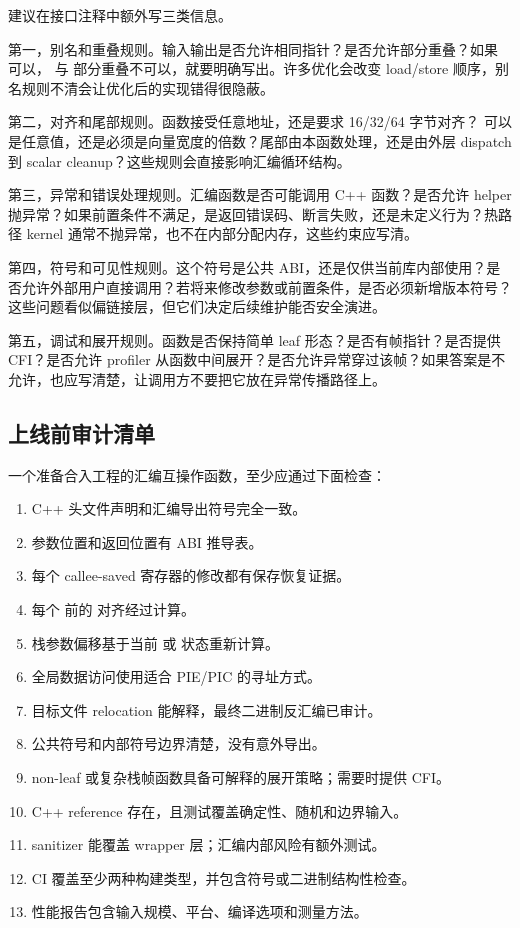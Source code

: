 建议在接口注释中额外写三类信息。

第一，别名和重叠规则。输入输出是否允许相同指针？是否允许部分重叠？如果  可以， 与  部分重叠不可以，就要明确写出。许多优化会改变 load/store 顺序，别名规则不清会让优化后的实现错得很隐蔽。

第二，对齐和尾部规则。函数接受任意地址，还是要求 16/32/64 字节对齐？ 可以是任意值，还是必须是向量宽度的倍数？尾部由本函数处理，还是由外层 dispatch 到 scalar cleanup？这些规则会直接影响汇编循环结构。

第三，异常和错误处理规则。汇编函数是否可能调用 C++ 函数？是否允许 helper 抛异常？如果前置条件不满足，是返回错误码、断言失败，还是未定义行为？热路径 kernel 通常不抛异常，也不在内部分配内存，这些约束应写清。

第四，符号和可见性规则。这个符号是公共 ABI，还是仅供当前库内部使用？是否允许外部用户直接调用？若将来修改参数或前置条件，是否必须新增版本符号？这些问题看似偏链接层，但它们决定后续维护能否安全演进。

第五，调试和展开规则。函数是否保持简单 leaf 形态？是否有帧指针？是否提供 CFI？是否允许 profiler 从函数中间展开？是否允许异常穿过该帧？如果答案是不允许，也应写清楚，让调用方不要把它放在异常传播路径上。

\subsection{上线前审计清单}

一个准备合入工程的汇编互操作函数，至少应通过下面检查：

\begin{enumerate}
  \item C++ 头文件声明和汇编导出符号完全一致。
  \item 参数位置和返回位置有 ABI 推导表。
  \item 每个 callee-saved 寄存器的修改都有保存恢复证据。
  \item 每个  前的  对齐经过计算。
  \item 栈参数偏移基于当前  或  状态重新计算。
  \item 全局数据访问使用适合 PIE/PIC 的寻址方式。
  \item 目标文件 relocation 能解释，最终二进制反汇编已审计。
  \item 公共符号和内部符号边界清楚，没有意外导出。
  \item non-leaf 或复杂栈帧函数具备可解释的展开策略；需要时提供 CFI。
  \item C++ reference 存在，且测试覆盖确定性、随机和边界输入。
  \item sanitizer 能覆盖 wrapper 层；汇编内部风险有额外测试。
  \item CI 覆盖至少两种构建类型，并包含符号或二进制结构性检查。
  \item 性能报告包含输入规模、平台、编译选项和测量方法。
\end{enumerate}

